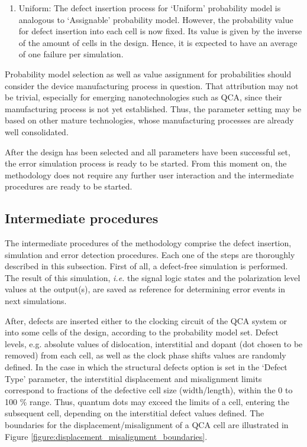 \begin{enumerate}
\begin{enumerate}
\begin{enumerate}
    \item Uniform: The defect insertion process for `Uniform' probability model is analogous to `Assignable' probability model. However, the probability value for defect insertion into each cell is now fixed. Its value is given by the inverse of the amount of cells in the design. Hence, it is expected to have an average of one failure per simulation.
\end{enumerate}

\end{enumerate}

Probability model selection as well as value assignment for probabilities should consider the device manufacturing process in question. That attribution may not be trivial, especially for emerging nanotechnologies such as QCA, since their manufacturing process is not yet established. Thus, the parameter setting may be based on other mature technologies, whose manufacturing processes are already well consolidated.

After the design has been selected and all parameters have been successful set, the error simulation process is ready to be started. From this moment on, the methodology does not require any further user interaction and the intermediate procedures are ready to be started.

\end{enumerate}

\subsection{Intermediate procedures}
\label{subsection_intermediate_procedures}

The intermediate procedures of the methodology comprise the defect insertion, simulation and error detection procedures. Each one of the steps are thoroughly described in this subsection. First of all, a defect-free simulation is performed. The result of this simulation, \textit{i.e.} the signal logic states and the polarization level values at the output(s), are saved as reference for determining error events in next simulations.

After, defects are inserted either to the clocking circuit of the QCA system or into some cells of the design, according to the probability model set. Defect levels, e.g. absolute values of dislocation, interstitial and dopant (dot chosen to be removed) from each cell, as well as the clock phase shifts values are randomly defined. In the case in which the structural defects option is set in the `Defect Type' parameter, the interstitial displacement and misalignment limits correspond to fractions of the defective cell size (width/length), within the 0 to 100 \% range. Thus, quantum dots may exceed the limits of a cell, entering the subsequent cell, depending on the interstitial defect values defined. The boundaries for the displacement/misalignment of a QCA cell are illustrated in Figure \ref{figure:displacement_misalignment_boundaries}.

